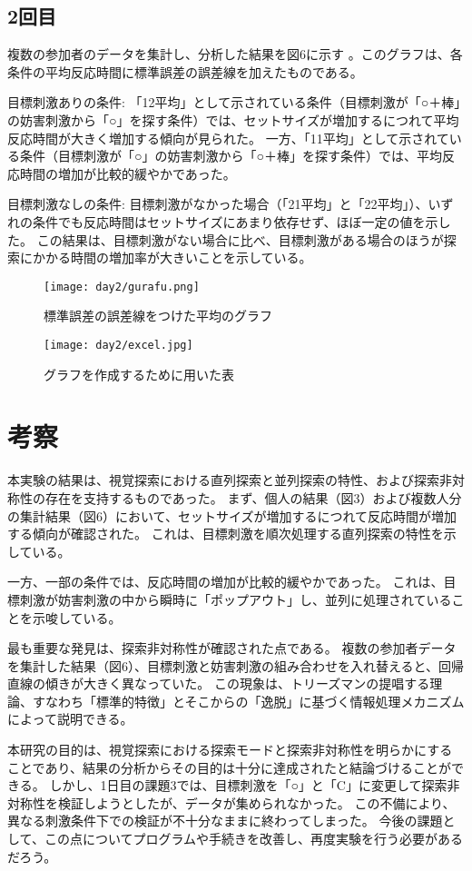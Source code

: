\documentclass{jlreq}
\begin{document}
\subsection{2回目}
複数の参加者のデータを集計し、分析した結果を図6に示す 。このグラフは、各条件の平均反応時間に標準誤差の誤差線を加えたものである。


目標刺激ありの条件: 「12平均」として示されている条件（目標刺激が「○＋棒」の妨害刺激から「○」を探す条件）では、セットサイズが増加するにつれて平均反応時間が大きく増加する傾向が見られた。
一方、「11平均」として示されている条件（目標刺激が「○」の妨害刺激から「○＋棒」を探す条件）では、平均反応時間の増加が比較的緩やかであった。

目標刺激なしの条件: 目標刺激がなかった場合（「21平均」と「22平均」）、いずれの条件でも反応時間はセットサイズにあまり依存せず、ほぼ一定の値を示した。
この結果は、目標刺激がない場合に比べ、目標刺激がある場合のほうが探索にかかる時間の増加率が大きいことを示している。
\begin{figure}[H]
    \centering
    \texttt{[image: day2/gurafu.png]}
    \caption{標準誤差の誤差線をつけた平均のグラフ}
    \label{fig:kadai1}
\end{figure}
\begin{figure}[H]
    \centering
    \texttt{[image: day2/excel.jpg]}
    \caption{グラフを作成するために用いた表}
    \label{fig:kadai1}
\end{figure}
\section{考察}
本実験の結果は、視覚探索における直列探索と並列探索の特性、および探索非対称性の存在を支持するものであった。
まず、個人の結果（図3）および複数人分の集計結果（図6）において、セットサイズが増加するにつれて反応時間が増加する傾向が確認された。
これは、目標刺激を順次処理する直列探索の特性を示している。

一方、一部の条件では、反応時間の増加が比較的緩やかであった。
これは、目標刺激が妨害刺激の中から瞬時に「ポップアウト」し、並列に処理されていることを示唆している。

最も重要な発見は、探索非対称性が確認された点である。
複数の参加者データを集計した結果（図6）、目標刺激と妨害刺激の組み合わせを入れ替えると、回帰直線の傾きが大きく異なっていた。
この現象は、トリーズマンの提唱する理論、すなわち「標準的特徴」とそこからの「逸脱」に基づく情報処理メカニズムによって説明できる。

本研究の目的は、視覚探索における探索モードと探索非対称性を明らかにすることであり、結果の分析からその目的は十分に達成されたと結論づけることができる。
しかし、1日目の課題3では、目標刺激を「○」と「C」に変更して探索非対称性を検証しようとしたが、データが集められなかった。
この不備により、異なる刺激条件下での検証が不十分なままに終わってしまった。
今後の課題として、この点についてプログラムや手続きを改善し、再度実験を行う必要があるだろう。
\end{document}
